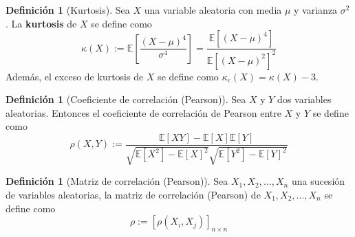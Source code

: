 \documentclass[11pt,a4paper]{book}
\theoremstyle{definition}%
\newtheorem{definicion}[teorema]{Definici\'on}
\newcommand{\EV}[1]{\mathbb{E}\left[#1\right]}
\begin{document}
            \begin{definicion}[Kurtosis]
                Sea $X$ una variable aleatoria con media $\mu$ y varianza $\sigma^2$. La \textbf{kurtosis} de $X$ se define como
                \begin{equation*}
                    \kappa(X) := \EV{\frac{(X-\mu)^4}{\sigma^4}}=\frac{\EV{(X-\mu)^4}}{\EV{(X-\mu)^2}^2}
                \end{equation*}
                Además, el exceso de kurtosis de $X$ se define como $\kappa_e(X) = \kappa(X)-3$.
            \end{definicion}
            \begin{definicion}[Coeficiente de correlación (Pearson)]
                Sea $X$ y $Y$ dos variables aleatorias. Entonces el coeficiente de correlación de Pearson entre $X$ y $Y$ se define como
                \begin{equation*}
                    \rho(X,Y) := \frac{\EV{XY}-\EV{X}\EV{Y}}{\sqrt{\EV{X^2}-\EV{X}^2}\sqrt{\EV{Y^2}-\EV{Y}^2}}
                \end{equation*}
            \end{definicion}
            \begin{definicion}[Matriz de correlación (Pearson)]
                Sea $X_1, X_2, \dots, X_n$ una sucesión de variables aleatorias, la matriz de correlación (Pearson) de $X_1, X_2, \dots, X_n$ se define como
                \begin{equation*}
                    \rho := [\rho(X_i, X_j)]_{n\times n}
                \end{equation*}
            \end{definicion}
\printbibliography
\end{document}

